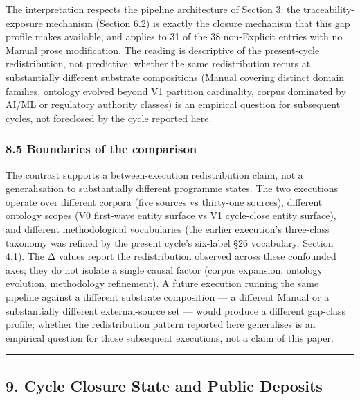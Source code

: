 \documentclass[
]{article}
\begin{document}
The interpretation respects the pipeline architecture of Section 3: the
traceability-exposure mechanism (Section 6.2) is exactly the closure
mechanism that this gap profile makes available, and applies to 31 of
the 38 non-Explicit entries with no Manual prose modification. The
reading is descriptive of the present-cycle redistribution, not
predictive: whether the same redistribution recurs at substantially
different substrate compositions (Manual covering distinct domain
families, ontology evolved beyond V1 partition cardinality, corpus
dominated by AI/ML or regulatory authority classes) is an empirical
question for subsequent cycles, not foreclosed by the cycle reported
here.

\subsubsection{8.5 Boundaries of the
comparison}\label{boundaries-of-the-comparison}

The contrast supports a between-execution redistribution claim, not a
generalisation to substantially different programme states. The two
executions operate over different corpora (five sources vs thirty-one
sources), different ontology scopes (V0 first-wave entity surface vs V1
cycle-close entity surface), and different methodological vocabularies
(the earlier execution's three-class taxonomy was refined by the present
cycle's six-label §26 vocabulary, Section 4.1). The Δ values report the
redistribution observed across these confounded axes; they do not
isolate a single causal factor (corpus expansion, ontology evolution,
methodology refinement). A future execution running the same pipeline
against a different substrate composition --- a different Manual or a
substantially different external-source set --- would produce a
different gap-class profile; whether the redistribution pattern reported
here generalises is an empirical question for those subsequent
executions, not a claim of this paper.

\begin{center}\rule{0.5\linewidth}{0.5pt}\end{center}

\subsection{9. Cycle Closure State and Public
Deposits}\label{cycle-closure-state-and-public-deposits}
\end{document}
